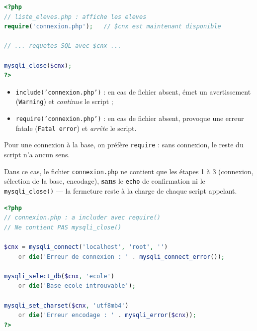 \documentclass[11pt]{article}
\begin{document}
\begin{propriete}
\begin{lstlisting}[language=Php]
<?php
// liste_eleves.php : affiche les eleves
require('connexion.php');   // $cnx est maintenant disponible

// ... requetes SQL avec $cnx ...

mysqli_close($cnx);
?>
\end{lstlisting}
\begin{itemize}
  \item \texttt{include('connexion.php')} : en cas de fichier absent, émet un avertissement (\texttt{Warning}) et \emph{continue} le script ;
  \item \texttt{require('connexion.php')} : en cas de fichier absent, provoque une erreur fatale (\texttt{Fatal error}) et \emph{arrête} le script.
\end{itemize}
Pour une connexion à la base, on préfère \texttt{require} : sans connexion, le reste du script n'a aucun sens.
\end{propriete}

Dans ce cas, le fichier \texttt{connexion.php} ne contient que les étapes 1 à 3 (connexion, sélection de la base, encodage), \textbf{sans} le \texttt{echo} de confirmation ni le \texttt{mysqli\_close()} — la fermeture reste à la charge de chaque script appelant.

\begin{exemplebox}
\begin{lstlisting}[language=Php]
<?php
// connexion.php : a includer avec require()
// Ne contient PAS mysqli_close()

$cnx = mysqli_connect('localhost', 'root', '')
    or die('Erreur de connexion : ' . mysqli_connect_error());

mysqli_select_db($cnx, 'ecole')
    or die('Base ecole introuvable');

mysqli_set_charset($cnx, 'utf8mb4')
    or die('Erreur encodage : ' . mysqli_error($cnx));
?>
\end{lstlisting}
\end{exemplebox}
\end{document}
